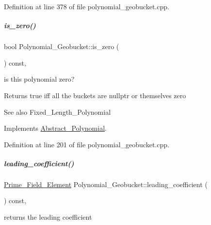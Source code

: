 Definition at line 378 of file polynomial\+\_\+geobucket.\+cpp.

\mbox{\label{group__polygroup_ac71d7f640ebdf764c5b81bf8d9a5686d}} 
\subparagraph{\texorpdfstring{is\+\_\+zero()}{is\_zero()}}
{\footnotesize\ttfamily bool Polynomial\+\_\+\+Geobucket\+::is\+\_\+zero (\begin{DoxyParamCaption}{ }\end{DoxyParamCaption}) const\hspace{0.3cm}{\ttfamily [override]}, {\ttfamily [virtual]}}



is this polynomial zero? 

\begin{DoxyReturn}{Returns}
{\ttfamily true} iff all the buckets are {\ttfamily nullptr} or themselves zero 
\end{DoxyReturn}
\begin{DoxySeeAlso}{See also}
Fixed\+\_\+\+Length\+\_\+\+Polynomial 
\end{DoxySeeAlso}


Implements \hyperlink{group__polygroup_afb4895702dd56895a792850a831c2f51}{Abstract\+\_\+\+Polynomial}.



Definition at line 201 of file polynomial\+\_\+geobucket.\+cpp.

\mbox{\label{group__polygroup_a096aa08d1d7be3522c140908989e4dea}} 
\subparagraph{\texorpdfstring{leading\+\_\+coefficient()}{leading\_coefficient()}}
{\footnotesize\ttfamily \hyperlink{group___fields_group_class_prime___field___element}{Prime\+\_\+\+Field\+\_\+\+Element} Polynomial\+\_\+\+Geobucket\+::leading\+\_\+coefficient (\begin{DoxyParamCaption}{ }\end{DoxyParamCaption}) const\hspace{0.3cm}{\ttfamily [override]}, {\ttfamily [virtual]}}



returns the leading coefficient 

